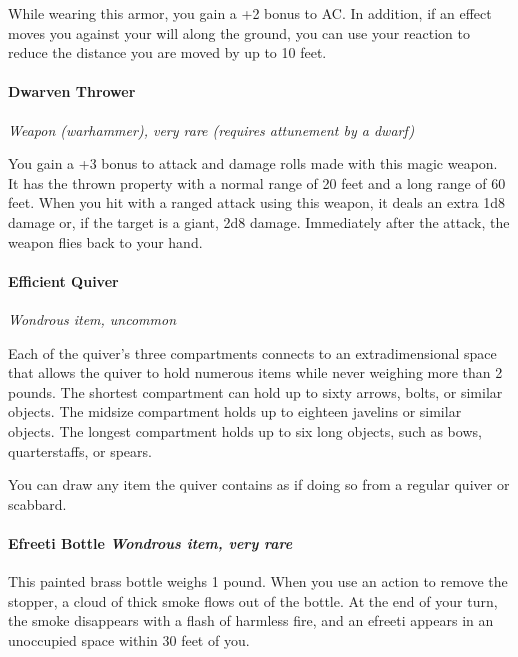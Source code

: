 \documentclass[
]{article}
\begin{document}
While wearing this armor, you gain a +2 bonus to AC. In addition, if an
effect moves you against your will along the ground, you can use your
reaction to reduce the distance you are moved by up to 10 feet.

\hypertarget{dwarven-thrower}{%
\paragraph{Dwarven Thrower}\label{dwarven-thrower}}

\emph{Weapon (warhammer), very rare (requires attunement by a dwarf)}

You gain a +3 bonus to attack and damage rolls made with this magic
weapon. It has the thrown property with a normal range of 20 feet and a
long range of 60 feet. When you hit with a ranged attack using this
weapon, it deals an extra 1d8 damage or, if the target is a giant, 2d8
damage. Immediately after the attack, the weapon flies back to your
hand.

\hypertarget{efficient-quiver}{%
\paragraph{Efficient Quiver}\label{efficient-quiver}}

\emph{Wondrous item, uncommon}

Each of the quiver's three compartments connects to an extradimensional
space that allows the quiver to hold numerous items while never weighing
more than 2 pounds. The shortest compartment can hold up to sixty
arrows, bolts, or similar objects. The midsize compartment holds up to
eighteen javelins or similar objects. The longest compartment holds up
to six long objects, such as bows, quarterstaffs, or spears.

You can draw any item the quiver contains as if doing so from a regular
quiver or scabbard.

\hypertarget{efreeti-bottle-wondrous-item-very-rare}{%
\paragraph{\texorpdfstring{Efreeti Bottle \emph{Wondrous item, very
rare}}{Efreeti Bottle Wondrous item, very rare}}\label{efreeti-bottle-wondrous-item-very-rare}}

This painted brass bottle weighs 1 pound. When you use an action to
remove the stopper, a cloud of thick smoke flows out of the bottle. At
the end of your turn, the smoke disappears with a flash of harmless
fire, and an efreeti appears in an unoccupied space within 30 feet of
you.
\end{document}
